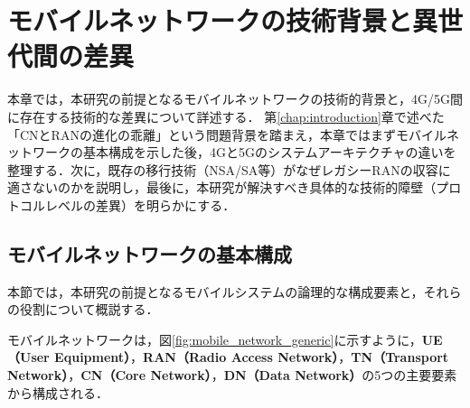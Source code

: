 \chapter{モバイルネットワークの技術背景と異世代間の差異}
\label{chap:background}

本章では，本研究の前提となるモバイルネットワークの技術的背景と，4G/5G間に存在する技術的な差異について詳述する．
第\ref{chap:introduction}章で述べた「CNとRANの進化の乖離」という問題背景を踏まえ，本章ではまずモバイルネットワークの基本構成を示した後，4Gと5Gのシステムアーキテクチャの違いを整理する．次に，既存の移行技術（NSA/SA等）がなぜレガシーRANの収容に適さないのかを説明し，最後に，本研究が解決すべき具体的な技術的障壁（プロトコルレベルの差異）を明らかにする．

\section{モバイルネットワークの基本構成}

本節では，本研究の前提となるモバイルシステムの論理的な構成要素と，それらの役割について概説する．

モバイルネットワークは，図\ref{fig:mobile_network_generic}に示すように，\textbf{UE（User Equipment）}，\textbf{RAN（Radio Access Network）}，\textbf{TN（Transport Network）}，\textbf{CN（Core Network）}，\textbf{DN（Data Network）}の5つの主要要素から構成される．

